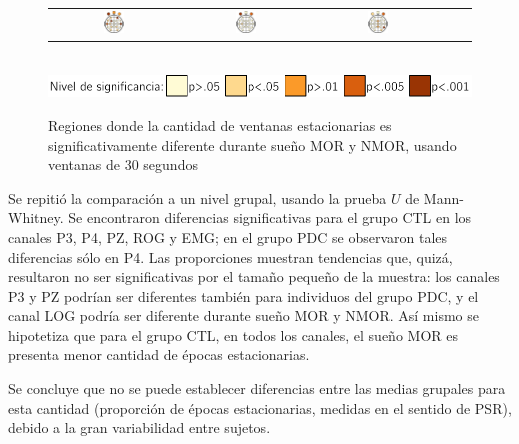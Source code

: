 \begin{figure}
\begin{tabular}{ccccc}
\includegraphics[width=0.17\textwidth]{./img_art_dfa/cabeza_new_RRU_30.pdf} &
\includegraphics[width=0.17\textwidth]{./img_art_dfa/cabeza_new_JGZ_30.pdf} &
\includegraphics[width=0.17\textwidth]{./img_art_dfa/cabeza_new_AEFP_30.pdf} \\
\end{tabular} \\
\includegraphics[scale=.7]{./img_art_dfa/escala.pdf} \\
\caption{Regiones donde la cantidad de ventanas estacionarias es significativamente diferente 
durante sueño MOR y NMOR, usando ventanas de 30 segundos}
\label{cabeza_new}
\end{figure}

Se repitió la comparación a un nivel grupal, usando la prueba $U$ de  Mann-Whitney.
Se encontraron diferencias significativas para el grupo CTL en los canales P3, P4, PZ, 
ROG y EMG; en el grupo PDC se observaron tales diferencias sólo en P4.
%
Las proporciones muestran tendencias que, quizá, resultaron no ser significativas
por el tamaño pequeño de la muestra: los canales P3 y PZ podrían ser diferentes también para
individuos del grupo PDC, y el canal LOG podría ser diferente durante sueño MOR y NMOR.
%
Así mismo se hipotetiza que para el grupo CTL, en todos los canales, el sueño MOR
es presenta menor cantidad de épocas estacionarias.

Se concluye que
no se puede establecer diferencias entre las medias grupales para esta cantidad (proporción de
épocas estacionarias, medidas en el sentido de PSR), debido a la gran variabilidad entre sujetos.

